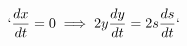 \documentclass[preview]{standalone}
\begin{document}
\begin{align*}
`\frac{dx}{dt} = 0 \implies 2y \frac{dy}{dt} = 2s \frac{ds}{dt}`
\end{align*}
\end{document}
